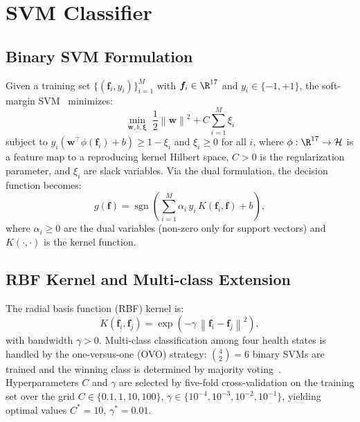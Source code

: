 \documentclass[conference,a4paper]{IEEEtran}[2015/08/26]
\newcommand{\vek}[1]{\bm{#1}}
\newcommand{\norm}[1]{\left\|#1\right\|}
\DeclareMathOperator{\sgn}{sgn}
\begin{document}
\section{SVM Classifier}
\label{sec:svm}

\subsection{Binary SVM Formulation}

Given a training set $\{(\vek{f}_i, y_i)\}_{i=1}^{M}$ with
$\vek{f}_i \in \R^{17}$ and $y_i \in \{-1, +1\}$, the soft-margin
SVM~\cite{Cortes1995} minimizes:
\begin{equation}
  \min_{\vek{w}, b, \vek{\xi}} \;\frac{1}{2}\norm{\vek{w}}^2
    + C \sum_{i=1}^{M} \xi_i
  \label{eq:svm_primal}
\end{equation}
subject to $y_i(\vek{w}^\top \phi(\vek{f}_i) + b) \ge 1 - \xi_i$
and $\xi_i \ge 0$ for all $i$, where $\phi : \R^{17} \to \mathcal{H}$
is a feature map to a reproducing kernel Hilbert space, $C > 0$ is
the regularization parameter, and $\xi_i$ are slack variables.
Via the dual formulation, the decision function becomes:
\begin{equation}
  g(\vek{f}) = \sgn\!\left(\sum_{i=1}^{M} \alpha_i\, y_i\,
    K(\vek{f}_i, \vek{f}) + b\right),
  \label{eq:svm_decision}
\end{equation}
where $\alpha_i \ge 0$ are the dual variables (non-zero only for
support vectors) and $K(\cdot,\cdot)$ is the kernel function.

\subsection{RBF Kernel and Multi-class Extension}

The radial basis function (RBF) kernel is:
\begin{equation}
  K(\vek{f}_i, \vek{f}_j) = \exp\!\left(-\gamma\,\norm{\vek{f}_i - \vek{f}_j}^2\right),
  \label{eq:rbf}
\end{equation}
with bandwidth $\gamma > 0$. Multi-class classification among four
health states is handled by the one-versus-one (OVO) strategy:
$\binom{4}{2} = 6$ binary SVMs are trained and the winning class is
determined by majority voting~\cite{Chang2011}. Hyperparameters
$C$ and $\gamma$ are selected by five-fold cross-validation on the
training set over the grid
$C \in \{0.1, 1, 10, 100\}$, $\gamma \in \{10^{-4}, 10^{-3}, 10^{-2}, 10^{-1}\}$,
yielding optimal values $C^* = 10$, $\gamma^* = 0.01$.
\end{document}
